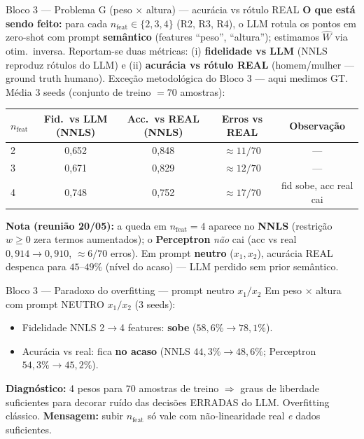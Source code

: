 \documentclass[aspectratio=169,10pt]{beamer}
\begin{document}
\begin{frame}{Bloco 3 --- Problema G (peso $\times$ altura) --- acur\'acia vs r\'otulo REAL}
  \scriptsize
  \textbf{O que est\'a sendo feito:} para cada $n_{\text{feat}} \in \{2, 3, 4\}$ (R2, R3, R4), o LLM rotula os pontos em zero-shot com prompt \textbf{sem\^antico} (features ``peso'', ``altura''); estimamos $\hat W$ via otim.\ inversa. Reportam-se duas m\'etricas: (i) \textbf{fidelidade vs LLM} (NNLS reproduz r\'otulos do LLM) e (ii) \textbf{acur\'acia vs r\'otulo REAL} (homem/mulher --- ground truth humano). Exce\c{c}\~ao metodol\'ogica do Bloco 3 --- aqui medimos GT.
  \medskip
  M\'edia 3 seeds (conjunto de treino $= 70$ amostras):
  \begin{center}
  \begin{tabular}{lcccc}
    \toprule
    $n_{\text{feat}}$ & Fid.\ vs LLM (NNLS) & Acc.\ vs REAL (NNLS) & \textbf{Erros vs REAL} & Observa\c{c}\~ao \\
    \midrule
    2 & 0{,}652 & 0{,}848 & $\approx 11/70$ & --- \\
    3 & 0{,}671 & 0{,}829 & $\approx 12/70$ & --- \\
    4 & 0{,}748 & 0{,}752 & $\approx 17/70$ & fid sobe, acc real cai \\
    \bottomrule
  \end{tabular}
  \end{center}
  \tiny
  \textbf{Nota (reuni\~ao 20/05):} a queda em $n_{\text{feat}}=4$ aparece no \textbf{NNLS} (restri\c{c}\~ao $w \geq 0$ zera termos aumentados); o \textbf{Perceptron} \emph{n\~ao} cai (acc vs real $0{,}914 \to 0{,}910$, $\approx 6/70$ erros). Em prompt \textbf{neutro} ($x_1, x_2$), acur\'acia REAL despenca para $45$--$49\%$ (n\'ivel do acaso) --- LLM perdido sem prior sem\^antico.
\end{frame}

\begin{frame}{Bloco 3 --- Paradoxo do overfitting --- prompt neutro $x_1/x_2$}
  \footnotesize
  Em peso $\times$ altura com prompt NEUTRO $x_1/x_2$ (3 seeds):
  \begin{itemize}
    \item Fidelidade NNLS 2$\to$4 features: \textbf{sobe} ($58{,}6\% \to 78{,}1\%$).
    \item Acur\'acia vs real: fica \textbf{no acaso} (NNLS $44{,}3\% \to 48{,}6\%$; Perceptron $54{,}3\% \to 45{,}2\%$).
  \end{itemize}
  \medskip
  \textbf{Diagn\'ostico:} 4 pesos para 70 amostras de treino $\Rightarrow$ graus de liberdade suficientes para decorar ru\'ido das decis\~oes ERRADAS do LLM. Overfitting cl\'assico.
  \medskip
  \textbf{Mensagem:} subir $n_{\text{feat}}$ s\'o vale com n\~ao-linearidade real \emph{e} dados suficientes.
\end{frame}
\end{document}
